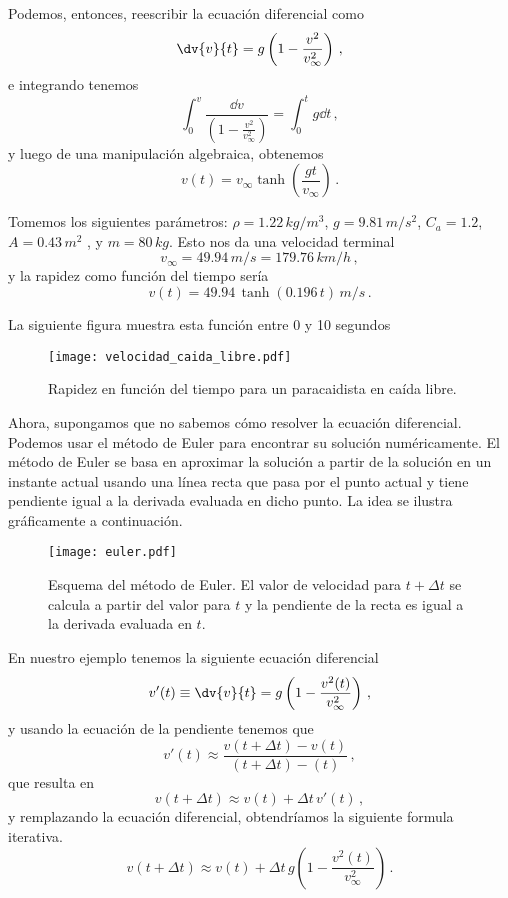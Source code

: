 Podemos, entonces, reescribir la ecuación diferencial como
\[\dv{v}{t} = g\left(1 - \frac{v^2}{v_\infty^2}\right)\, ,\]
e integrando tenemos
\[\int_0^v \frac{\dd{v}}{\left(1 - \frac{v^2}{v_\infty^2}\right)} = \int_0^t g \dd{t}\, ,\]
y luego de una manipulación algebraica, obtenemos
\[v(t) = v_\infty \tanh\left(\frac{gt}{v_\infty}\right)\, .\]

Tomemos los siguientes parámetros: \(\rho = 1.22\, \unit{kg/m^3}\), \(g=9.81\, \unit{m/s^2}\), \(C_a = 1.2\), \(A = 0.43\, \unit{m^2}\) , y
\(m = 80\, \unit{kg}\). Esto nos da una velocidad terminal
\[v_\infty = 49.94\, \unit{m/s} = 179.76\, \unit{km/h}\, ,\]
y la rapidez como función del tiempo sería
\[v(t) = 49.94\, \tanh(0.196\, t)\, \unit{m/s}\, .\]

La siguiente figura muestra esta función entre 0 y 10 segundos
\begin{figure}[H] 
\centering
\texttt{[image: velocidad\_caida\_libre.pdf]}
\caption{Rapidez en función del tiempo para un paracaidista en caída libre.}
\label{fig:vel_caida_libre}
\end{figure}

Ahora, supongamos que no sabemos cómo resolver la ecuación diferencial. Podemos usar el método de Euler para encontrar su solución numéricamente. El método de Euler se basa en aproximar la solución a partir de la solución en un instante actual usando una línea recta que pasa por el punto actual y tiene pendiente igual a la derivada evaluada en dicho punto. La idea se ilustra gráficamente a continuación.
\begin{figure}[H] 
\centering
\texttt{[image: euler.pdf]}
\caption{Esquema del método de Euler. El valor de velocidad para \(t +\Delta t\) se calcula a partir del valor para \(t\) y la pendiente de la recta es igual a la derivada evaluada en \(t\).}
\label{fig:metodo_euler}
\end{figure}

En nuestro ejemplo tenemos la siguiente ecuación diferencial
\[v'(t) \equiv \dv{v}{t} = g\left(1 - \frac{v^2(t)}{v_\infty^2}\right)\, ,\]
y usando la ecuación de la pendiente tenemos que
\[v'(t) \approx \frac{v(t + \Delta t) - v(t)}{(t+\Delta t) - (t)}\, ,\]
que resulta en
\[v(t + \Delta t) \approx v(t) + \Delta t\, v'(t)\, ,\]
y remplazando la ecuación diferencial, obtendríamos la siguiente formula iterativa.
\[ v(t + \Delta t) \approx v(t) + \Delta t\, g\left(1 - \frac{v^2(t)}{v_\infty^2}\right)\, .\]

